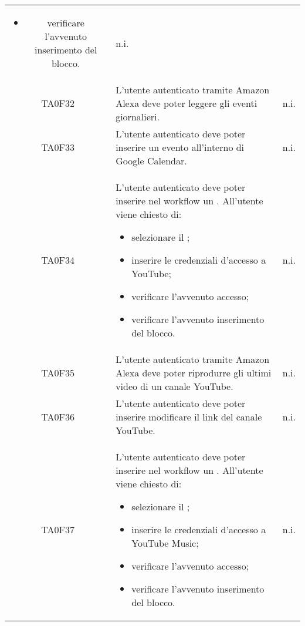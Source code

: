 \begin{center}
\begin{longtable}{ c m{12cm} c }
\begin{itemize}
		\item verificare l'avvenuto inserimento del blocco.										
	\end{itemize} 																																								& n.i. \\   
	TA0F32   & L'utente autenticato tramite Amazon Alexa deve poter leggere gli eventi giornalieri.                                             										& n.i. \\
	TA0F33   & L'utente autenticato deve poter inserire un evento all'interno di Google Calendar.                                        										& n.i. \\
	TA0F34   & L'utente autenticato deve poter inserire nel workflow un \BYouTube. All'utente viene chiesto di: \begin{itemize}										
		\item selezionare il \BYouTube;										
		\item inserire le credenziali d'accesso a YouTube;										
		\item verificare l'avvenuto accesso;										
		\item verificare l'avvenuto inserimento del blocco.										
	\end{itemize} 																																								& n.i. \\ 
	TA0F35   & L'utente autenticato tramite Amazon Alexa deve poter riprodurre gli ultimi video di un canale YouTube.                           										& n.i. \\
	TA0F36   & L'utente autenticato deve poter inserire modificare il link del canale YouTube.                                          										& n.i. \\
	TA0F37   & L'utente autenticato deve poter inserire nel workflow un \BYouTubeMusic. All'utente viene chiesto di: \begin{itemize}										
		\item selezionare il \BYouTubeMusic;										
		\item inserire le credenziali d'accesso a YouTube Music;										
		\item verificare l'avvenuto accesso;										
		\item verificare l'avvenuto inserimento del blocco.										
	\end{itemize} 																																								& n.i. \\ 

\end{longtable}
\end{center}
